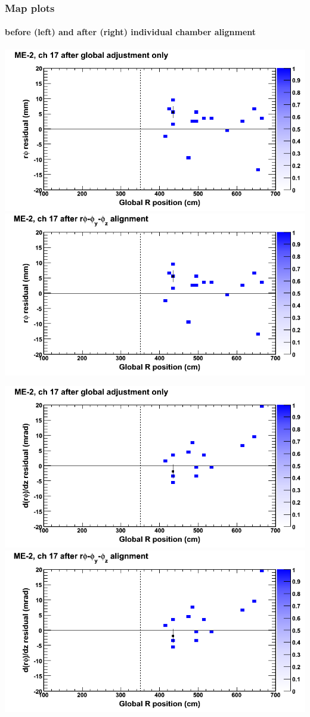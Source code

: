 \documentclass[compress]{beamer}
\begin{document}
\begin{frame}
\frametitle{Map plots}
\framesubtitle{before (left) and after (right) individual chamber alignment}
\includegraphics[width=0.5\linewidth]{ringmapplots_3dof/before_CSCvsr_mem2ch17_x.png} \includegraphics[width=0.5\linewidth]{ringmapplots_3dof/after_CSCvsr_mem2ch17_x.png}

\includegraphics[width=0.5\linewidth]{ringmapplots_3dof/before_CSCvsr_mem2ch17_dxdz.png} \includegraphics[width=0.5\linewidth]{ringmapplots_3dof/after_CSCvsr_mem2ch17_dxdz.png}
\end{frame}
\end{document}
